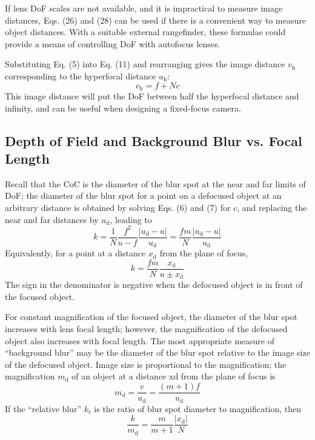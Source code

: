 \documentclass[11pt, oneside]{scrartcl}   	%
\begin{document}
If lens DoF scales are not available, and it is impractical to measure image distances, Eqs. (26) and (28) can be used if there is a convenient way to measure object distances. With a suitable external rangefinder, these formulae could provide a means of controlling DoF with autofocus lenses.

Substituting Eq. (5) into Eq. (11) and rearranging gives the image distance $v_\mathrm{h}$ corresponding to the hyperfocal distance $u_\mathrm{h}$:
\begin{equation}
   v_\mathrm{h} = f + N\!c
   \label{eq:vh} 
\end{equation}
This image distance will put the DoF between half the hyperfocal distance and infinity, and
can be useful when designing a fixed-focus camera.

\subsection{Depth of Field and Background Blur vs. Focal Length}

Recall that the CoC is the diameter of the blur spot at the near and far limits of DoF; the diameter of the blur spot for a point on a defocused object at an arbitrary distance is obtained by solving Eqs. (6) and (7) for $c$, and replacing the near and far distances by $u_\mathrm{d}$, leading to
\begin{equation}
   k = \frac1N \frac{f^2}{u-f}  \frac{|u_\mathrm{d} - u|}{u_\mathrm{d}} = \frac{fm}N \frac{|u_\mathrm{d} - u|}{u_\mathrm{d}}
   \label{eq:k1}
\end{equation}
Equivalently, for a point at a distance $x_\mathrm{d}$ from the plane of focus, 
\begin{equation}
   k = \frac{fm}N \frac{x_\mathrm{d}}{u\pm x_\mathrm{d}}
   \label{eq:k2}
\end{equation}
 The sign in the denominator is negative when the defocused object is in front of the focused object.

For constant magnification of the focused object, the diameter of the blur spot increases with lens focal length; however, the magnification of the defocused object also increases with focal length. The most appropriate measure of “background blur” may be the diameter of the blur spot relative to the image size of the defocused object. Image size is proportional to the magnification; the magnification $m_\mathrm{d}$ of an object at a distance xd from the plane of focus is
\begin{equation}
   m_\mathrm{d} = \frac v {u_\mathrm{d}} = \frac{(m+1)f}{u_\mathrm{d}} 
   \label{eq:md}
\end{equation}
If the “relative blur” $k_\mathrm{r}$ is the ratio of blur spot diameter to magnification, then
\begin{equation}
    \frac{k}{m_\mathrm{d}} = \frac m{m+1}\frac{|x_\mathrm{d}|}N
    \label{eq:km}
\end{equation}
\end{document}
